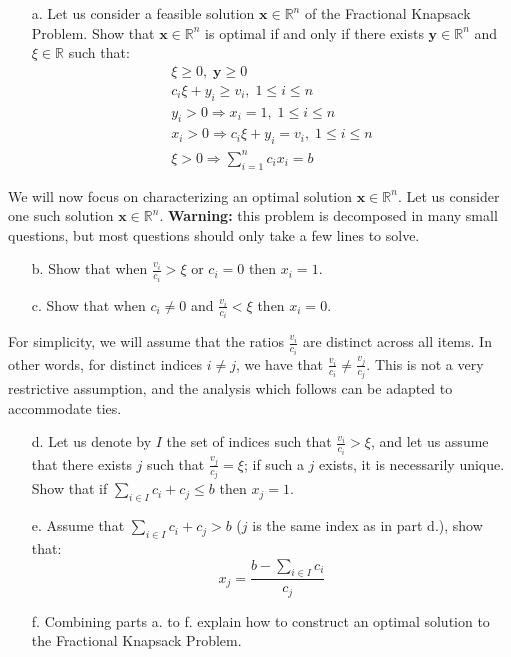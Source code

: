 \documentclass[11pt]{article}
\theoremstyle{remark}
\newcommand{\R}{\mathbb{R}}                     %
\newcommand{\bx}{\mathbf{x}}
\newcommand{\by}{\mathbf{y}}
\begin{document}
\begin{itemize}
    \item[a.] Let us consider a feasible solution $\bx\in\R^n$ of the
        Fractional Knapsack Problem. Show that $\bx\in\R^n$ is optimal if and
        only if there exists $\by\in\R^n$ and $\xi\in\R$ such that:
        \begin{gather*}
            \xi\geq 0,\; \by\geq 0\\
            c_i\xi + y_i\geq v_i,\;1\leq i\leq n\\
            y_i>0\Rightarrow x_i = 1,\; 1\leq i\leq n\\
            x_i>0\Rightarrow c_i\xi + y_i = v_i,\; 1\leq i\leq n\\
            \xi>0\Rightarrow \sum_{i=1}^n c_ix_i = b
        \end{gather*}
\end{itemize}
We will now focus on characterizing an optimal solution $\bx\in\R^n$. Let us
consider one such solution $\bx\in\R^n$. \textbf{Warning:} this problem is
decomposed in many small questions, but most questions should only take a few
lines to solve.
\begin{itemize}
    \item[b.] Show that when $\frac{v_i}{c_i}>\xi$ or $c_i = 0$ then $x_i
        = 1$.
    \item[c.] Show that when $c_i\neq 0$ and $\frac{v_i}{c_i}< \xi$ then $x_i
        = 0$.
\end{itemize}
For simplicity, we will assume that the ratios $\frac{v_i}{c_i}$ are distinct
across all items. In other words, for distinct indices $i\neq j$, we have that
$\frac{v_i}{c_i}\neq\frac{v_j}{c_j}$. This is not a very restrictive
assumption, and the analysis which follows can be adapted to accommodate ties.
\begin{itemize}
    \item[d.] Let us denote by $I$ the set of indices such that
        $\frac{v_i}{c_i}>\xi$, and let us assume that there exists $j$ such
        that $\frac{v_j}{c_j} = \xi$; if such a $j$ exists, it is necessarily
        unique. Show that if $\sum_{i\in I}c_i + c_j \leq b$ then $x_j = 1$.
    \item[e.] Assume that $\sum_{i\in I}c_i + c_j > b$ ($j$ is the same index
        as in part d.), show that:
        \begin{displaymath}
            x_j = \frac{b-\sum_{i\in I}c_i}{c_j}
        \end{displaymath}
    \item[f.] Combining parts a. to f. explain how to construct an optimal
        solution to the Fractional Knapsack Problem.
\end{itemize}
\end{document}
